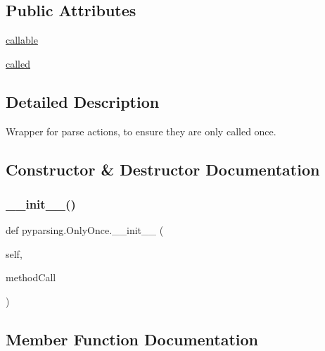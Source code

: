 \subsection*{Public Attributes}
\begin{DoxyCompactItemize}
\item 
\hyperlink{classpyparsing_1_1OnlyOnce_a623b2535c9035c5516c53e86b06464b8}{callable}
\item 
\hyperlink{classpyparsing_1_1OnlyOnce_ac7b815f6552deef754c23f190fe68da9}{called}
\end{DoxyCompactItemize}


\subsection{Detailed Description}
\begin{DoxyVerb}Wrapper for parse actions, to ensure they are only called once.
\end{DoxyVerb}
 

\subsection{Constructor \& Destructor Documentation}
\mbox{\label{classpyparsing_1_1OnlyOnce_a0e7e377312c13d91e629b6b12ca73e82}} 
\subsubsection{\texorpdfstring{\+\_\+\+\_\+init\+\_\+\+\_\+()}{\_\_init\_\_()}}
{\footnotesize\ttfamily def pyparsing.\+Only\+Once.\+\_\+\+\_\+init\+\_\+\+\_\+ (\begin{DoxyParamCaption}\item[{}]{self,  }\item[{}]{method\+Call }\end{DoxyParamCaption})}



\subsection{Member Function Documentation}
\mbox{\label{classpyparsing_1_1OnlyOnce_a0f5dbfa79e8403af478b0d835e09f5b5}} 
